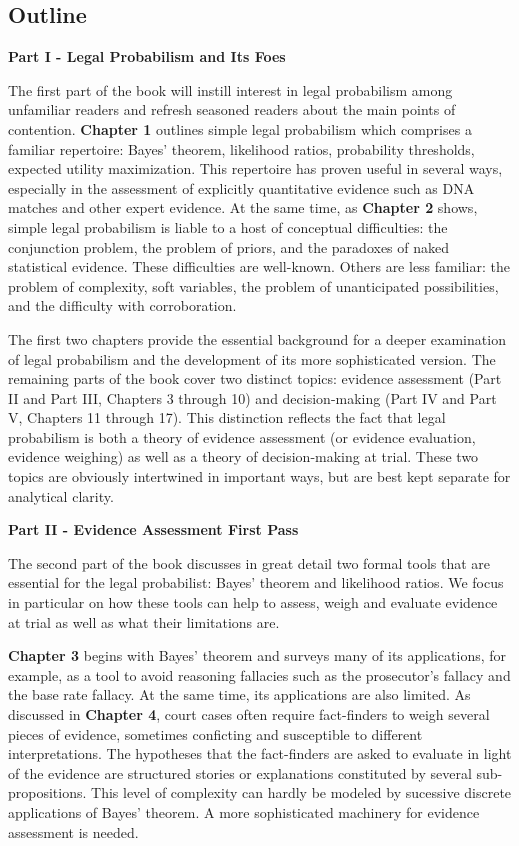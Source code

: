 \documentclass[
  10pt,
  dvipsnames,enabledeprecatedfontcommands]{scrartcl}
\begin{document}
\hypertarget{outline}{%
\subsection{Outline}\label{outline}}

\noindent \textbf{Part I - Legal Probabilism and Its Foes}

\noindent The first part of the book will instill interest in legal
probabilism among unfamiliar readers and refresh seasoned readers about
the main points of contention. \textbf{Chapter 1} outlines simple legal
probabilism which comprises a familiar repertoire: Bayes' theorem,
likelihood ratios, probability thresholds, expected utility
maximization. This repertoire has proven useful in several ways,
especially in the assessment of explicitly quantitative evidence such as
DNA matches and other expert evidence. At the same time, as
\textbf{Chapter 2} shows, simple legal probabilism is liable to a host
of conceptual difficulties: the conjunction problem, the problem of
priors, and the paradoxes of naked statistical evidence. These
difficulties are well-known. Others are less familiar: the problem of
complexity, soft variables, the problem of unanticipated possibilities,
and the difficulty with corroboration.

The first two chapters provide the essential background for a deeper
examination of legal probabilism and the development of its more
sophisticated version. The remaining parts of the book cover two
distinct topics: evidence assessment (Part II and Part III, Chapters 3
through 10) and decision-making (Part IV and Part V, Chapters 11 through
17). This distinction reflects the fact that legal probabilism is both a
theory of evidence assessment (or evidence evaluation, evidence
weighing) as well as a theory of decision-making at trial. These two
topics are obviously intertwined in important ways, but are best kept
separate for analytical clarity.

\vspace{3mm}

\noindent \textbf{Part II - Evidence Assessment First Pass}

\noindent The second part of the book discusses in great detail two
formal tools that are essential for the legal probabilist: Bayes'
theorem and likelihood ratios. We focus in particular on how these tools
can help to assess, weigh and evaluate evidence at trial as well as what
their limitations are.

\textbf{Chapter 3} begins with Bayes' theorem and surveys many of its
applications, for example, as a tool to avoid reasoning fallacies such
as the prosecutor's fallacy and the base rate fallacy. At the same time,
its applications are also limited. As discussed in \textbf{Chapter 4},
court cases often require fact-finders to weigh several pieces of
evidence, sometimes conficting and susceptible to different
interpretations. The hypotheses that the fact-finders are asked to
evaluate in light of the evidence are structured stories or explanations
constituted by several sub-propositions. This level of complexity can
hardly be modeled by sucessive discrete applications of Bayes' theorem.
A more sophisticated machinery for evidence assessment is needed.
\end{document}
